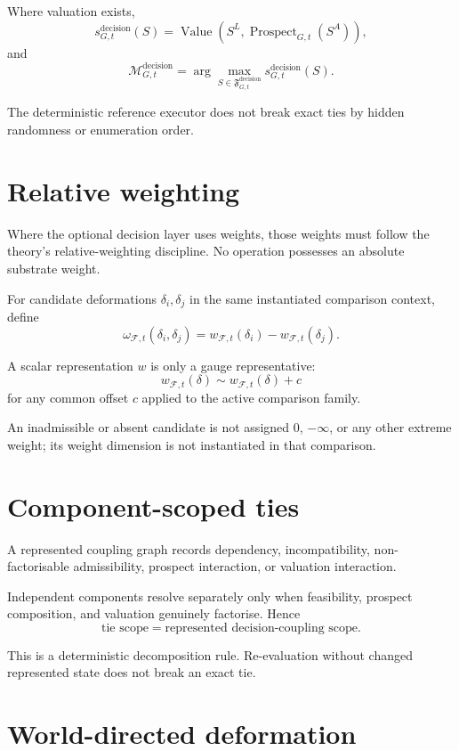 \documentclass[11pt,a4paper]{article}
\newcommand{\Frame}{\mathcal F}
\theoremstyle{remark}
\begin{document}
Where valuation exists,
\[
s_{G,t}^{\mathrm{decision}}(S)
=
\operatorname{Value}
\left(
S^L,
\operatorname{Prospect}_{G,t}(S^A)
\right),
\]
and
\[
\mathcal M_{G,t}^{\mathrm{decision}}
=
\arg\max_{S\in\mathfrak F_{G,t}^{\mathrm{decision}}}
s_{G,t}^{\mathrm{decision}}(S).
\]

The deterministic reference executor does not break exact ties by hidden randomness or enumeration order.

\section{Relative weighting}\label{sec:weighting}

Where the optional decision layer uses weights, those weights must follow the theory's relative-weighting discipline. No operation possesses an absolute substrate weight.

For candidate deformations $\delta_i,\delta_j$ in the same instantiated comparison context, define
\[
\omega_{\Frame,t}(\delta_i,\delta_j)
=
w_{\Frame,t}(\delta_i)-w_{\Frame,t}(\delta_j).
\]

A scalar representation $w$ is only a gauge representative:
\[
w_{\Frame,t}(\delta)
\sim
w_{\Frame,t}(\delta)+c
\]
for any common offset $c$ applied to the active comparison family.

An inadmissible or absent candidate is not assigned $0$, $-\infty$, or any other extreme weight; its weight dimension is not instantiated in that comparison.

\section{Component-scoped ties}\label{sec:ties}

A represented coupling graph records dependency, incompatibility, non-factorisable admissibility, prospect interaction, or valuation interaction.

Independent components resolve separately only when feasibility, prospect composition, and valuation genuinely factorise. Hence
\[
\boxed{
\text{tie scope}
=
\text{represented decision-coupling scope}.
}
\]

This is a deterministic decomposition rule. Re-evaluation without changed represented state does not break an exact tie.

\section{World-directed deformation}\label{sec:exposure}
\end{document}
